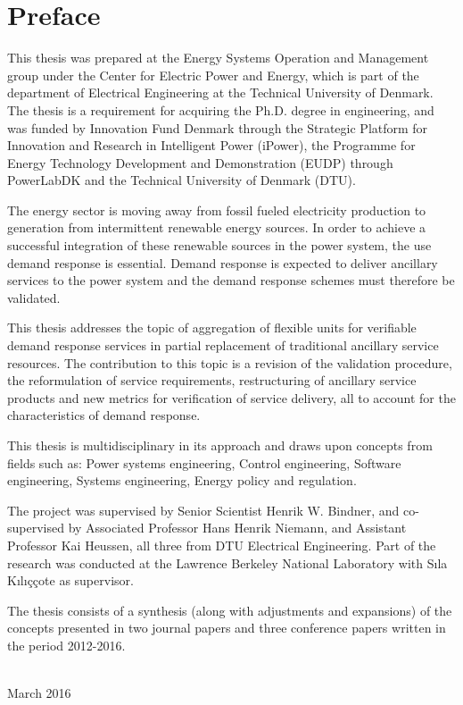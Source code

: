 \chapter{Preface}
This thesis was prepared at the Energy Systems Operation and Management group under the Center for Electric Power and Energy, which is part of the department of Electrical Engineering at the Technical University of Denmark. The thesis is a requirement for acquiring the Ph.D. degree in engineering, and was funded by Innovation Fund Denmark through the Strategic Platform for Innovation and Research in Intelligent Power (iPower), the Programme for Energy Technology Development and Demonstration (EUDP) through PowerLabDK and the Technical University of Denmark (DTU).

The energy sector is moving away from fossil fueled electricity production to generation from intermittent renewable energy sources. In order to achieve a successful integration of these renewable sources in the power system, the use demand response is essential. Demand response is expected to deliver ancillary services to the power system and the demand response schemes must therefore be validated. 

This thesis addresses the topic of aggregation of flexible units for verifiable demand response services in partial replacement of traditional ancillary service resources.
The contribution to this topic is a revision of the validation procedure, the reformulation of service requirements, restructuring of ancillary service products and new metrics for verification of service delivery, all to account for the characteristics of demand response.

This thesis is multidisciplinary in its approach and draws upon concepts from fields such as: Power systems engineering, Control engineering, Software engineering, Systems engineering, Energy policy and regulation.

The project was supervised by Senior Scientist Henrik W. Bindner, and co-supervised by Associated Professor Hans Henrik Niemann, and Assistant Professor Kai Heussen, all three from DTU Electrical Engineering. Part of the research was conducted at the Lawrence Berkeley National Laboratory with S{\i}la K{\i}l{\i}\c{c}\c{c}ote as supervisor.

The thesis consists of a synthesis (along with adjustments and expansions) of the concepts presented in two journal papers and three conference papers written in the period 2012-2016.
\vfill

{
\centering
\begin{flushright}
    \thesisauthor{}\\
March 2016
\end{flushright}
}
